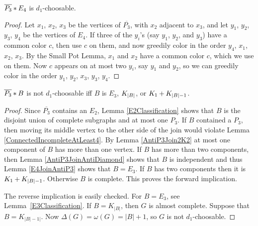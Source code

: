 \begin{lem}\label{E4JoinAntiP3}
$\overline{P_3} \mbox{\hspace{2 pt}$\ast$\hspace{2 pt}} E_4$ is $d_1$-choosable.
\end{lem}
\begin{proof}
Let $x_1$, $x_2$, $x_3$ be the vertices of $\overline{P_3}$, with $x_2$ adjacent
to $x_3$, and let $y_1$, $y_2$, $y_3$, $y_4$ be the vertices of $E_4$.  If three
of the $y_i$'s (say $y_1$, $y_2$, and $y_3$) have a common color $c$, then use
$c$ on them, and now greedily color in the order $y_4$, $x_1$, $x_2$, $x_3$.  By
the Small Pot Lemma, $x_1$ and $x_2$ have a common color $c$, which we use on
them.  Now $c$ appears on at most two $y_i$, say $y_1$ and $y_2$, so we can
greedily color in the order $y_1$, $y_2$, $x_3$, $y_3$, $y_4$.
\end{proof}

\begin{lem}\label{AntiP3Classification}
$\overline{P_3} \mbox{\hspace{2 pt}$\ast$\hspace{2 pt}} B$ is not $d_1$-choosable iff $B$ is $E_3$,
$K_{\left|B\right|}$, or $K_1 \mbox{\hspace{2 pt}$+$\hspace{2 pt}} K_{\left|B\right| - 1}$.
\end{lem}
\begin{proof}
Since $\overline{P_3}$ contains an $E_2$, Lemma \ref{E2Classification} shows that $B$ is the disjoint union of complete subgraphs and at most one $P_3$.  If $B$ contained a $P_3$, then moving its middle vertex to the other side of the join would violate Lemma \ref{ConnectedIncompleteAtLeast4}.  By Lemma \ref{AntiP3Join2K2} at most one component of $B$ has more than one vertex.  If $B$ has more than two components, then Lemma \ref{AntiP3JoinAntiDiamond} shows that $B$ is independent and thus Lemma \ref{E4JoinAntiP3} shows that $B = E_3$.  If $B$ has two components then it is $K_1 \mbox{\hspace{2 pt}$+$\hspace{2 pt}} K_{\left|B\right| - 1}$.  Otherwise $B$ is complete.  This proves the forward implication.

The reverse implication is easily checked.  For $B=E_3$, see
Lemma~\ref{E3Classification}.  If $B=K_{|B|}$, then $G$ is almost complete. 
Suppose that $B=K_{|B|-1|}$.  Now $\Delta(G)=\omega(G)=|B|+1$, so $G$ is not
$d_1$-choosable.
\end{proof}



